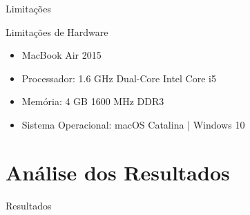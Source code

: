\documentclass[aspectratio=169]{beamer}
\begin{document}
\begin{frame}{Limitações}
	\begin{block}{Limitações de Hardware}
		\begin{itemize}
			\item MacBook Air 2015
			\item Processador: 1.6 GHz Dual-Core Intel Core i5
			\item Memória: 4 GB 1600 MHz DDR3
			\item Sistema Operacional: macOS Catalina | Windows 10
		\end{itemize}
	\end{block}
\end{frame}

\section{Análise dos Resultados}

\begin{frame}{Resultados}
	\begin{figure}
		\centering
		\hspace{1cm}
		\\
		\vspace{.2cm}
		\hspace{1cm}
	\end{figure}
\end{frame}
\end{document}
